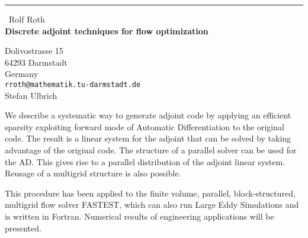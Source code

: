 \documentclass{report}
\begin{document}
\begin{center}
\rule{6in}{1pt} \
{\large Rolf Roth \\
{\bf Discrete adjoint techniques for flow optimization}}

Dolivostrasse 15 \\ 64293 Darmstadt \\ Germany
\\
{\tt rroth@mathematik.tu-darmstadt.de}\\
Stefan Ulbrich\end{center}

We describe a systematic way to generate adjoint code by applying an
efficient sparsity exploiting forward mode of Automatic Differentiation
to the original code. The result is a linear system for the adjoint that
can be solved by taking advantage of the original code.
The structure of a parallel solver can be used for the AD. This gives
rise to a parallel distribution of the adjoint linear system. Reusage of
a multigrid structure is also possible.

This procedure has been applied to the finite volume, parallel,
block-structured, multigrid flow solver FASTEST, which can also run Large
Eddy Simulations and is written in Fortran. Numerical results of
engineering applications will be presented.
\end{document}
